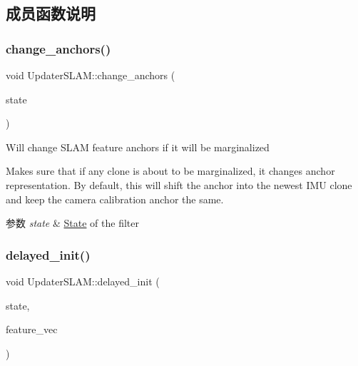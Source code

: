 \subsection{成员函数说明}
\mbox{\label{classov__msckf_1_1UpdaterSLAM_ae85d162f1a93f1dbed1a60b2fdd26870}} 
\subsubsection{\texorpdfstring{change\+\_\+anchors()}{change\_anchors()}}
{\footnotesize\ttfamily void Updater\+S\+L\+A\+M\+::change\+\_\+anchors (\begin{DoxyParamCaption}\item[{std\+::shared\+\_\+ptr$<$ \hyperlink{classov__msckf_1_1State}{State} $>$}]{state }\end{DoxyParamCaption})}



Will change S\+L\+AM feature anchors if it will be marginalized 

Makes sure that if any clone is about to be marginalized, it changes anchor representation. By default, this will shift the anchor into the newest I\+MU clone and keep the camera calibration anchor the same.


\begin{DoxyParams}{参数}
{\em state} & \hyperlink{classov__msckf_1_1State}{State} of the filter \\
\hline
\end{DoxyParams}
\mbox{\label{classov__msckf_1_1UpdaterSLAM_a4ef14978d06b4386672fe56c3a844fda}} 
\subsubsection{\texorpdfstring{delayed\+\_\+init()}{delayed\_init()}}
{\footnotesize\ttfamily void Updater\+S\+L\+A\+M\+::delayed\+\_\+init (\begin{DoxyParamCaption}\item[{std\+::shared\+\_\+ptr$<$ \hyperlink{classov__msckf_1_1State}{State} $>$}]{state,  }\item[{std\+::vector$<$ std\+::shared\+\_\+ptr$<$ \hyperlink{classov__core_1_1Feature}{ov\+\_\+core\+::\+Feature} $>$$>$ \&}]{feature\+\_\+vec }\end{DoxyParamCaption})}



